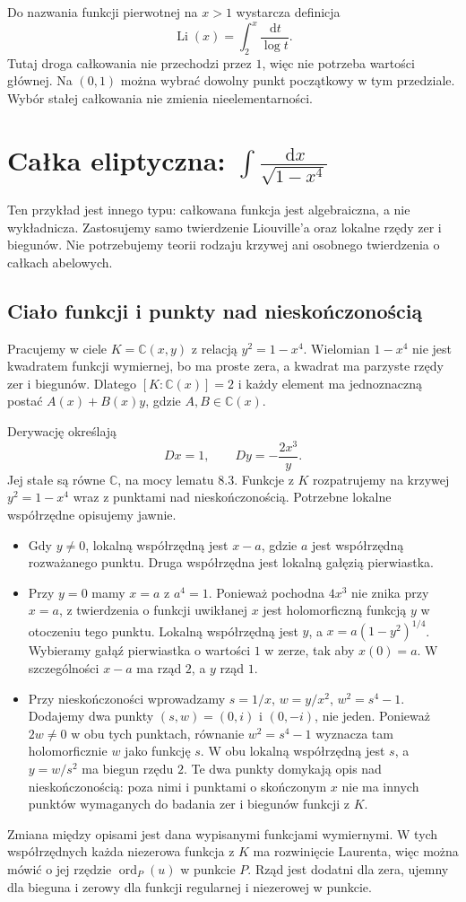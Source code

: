 \documentclass[11pt,a4paper,oneside]{book}
\numberwithin{equation}{section}
\theoremstyle{plain}
\theoremstyle{definition}
\theoremstyle{remark}
\newcommand{\C}{\mathbb{C}}
\newcommand{\ord}{\operatorname{ord}}
\newcommand{\dd}{\,\mathrm{d}}
\begin{document}
Do nazwania funkcji pierwotnej na $x>1$ wystarcza definicja
\[
\operatorname{Li}(x)=\int_2^x\frac{\dd t}{\log t}.
\]
Tutaj droga całkowania nie przechodzi przez $1$, więc nie potrzeba wartości głównej. Na $(0,1)$ można wybrać dowolny punkt początkowy w tym przedziale. Wybór stałej całkowania nie zmienia nieelementarności.

\section{Całka eliptyczna: $\int \frac{\dd x}{\sqrt{1-x^4}}$}

Ten przykład jest innego typu: całkowana funkcja jest algebraiczna, a nie wykładnicza. Zastosujemy samo twierdzenie Liouville'a oraz lokalne rzędy zer i biegunów. Nie potrzebujemy teorii rodzaju krzywej ani osobnego twierdzenia o całkach abelowych.

\subsection{Ciało funkcji i punkty nad nieskończonością}

Pracujemy w ciele $K=\C(x,y)$ z relacją $y^2=1-x^4$. Wielomian $1-x^4$ nie jest kwadratem funkcji wymiernej, bo ma proste zera, a kwadrat ma parzyste rzędy zer i biegunów. Dlatego $[K:\C(x)]=2$ i każdy element ma jednoznaczną postać $A(x)+B(x)y$, gdzie $A,B\in\C(x)$.

Derywację określają
\[
Dx=1,\qquad Dy=-\frac{2x^3}{y}.
\]
Jej stałe są równe $\C$, na mocy lematu 8.3. Funkcje z $K$ rozpatrujemy na krzywej $y^2=1-x^4$ wraz z punktami nad nieskończonością. Potrzebne lokalne współrzędne opisujemy jawnie.
\begin{itemize}
\item Gdy $y\ne0$, lokalną współrzędną jest $x-a$, gdzie $a$ jest współrzędną rozważanego punktu. Druga współrzędna jest lokalną gałęzią pierwiastka.
\item Przy $y=0$ mamy $x=a$ z $a^4=1$. Ponieważ pochodna $4x^3$ nie znika przy $x=a$, z twierdzenia o funkcji uwikłanej $x$ jest holomorficzną funkcją $y$ w otoczeniu tego punktu. Lokalną współrzędną jest $y$, a $x=a(1-y^2)^{1/4}$. Wybieramy gałąź pierwiastka o wartości $1$ w zerze, tak aby $x(0)=a$. W szczególności $x-a$ ma rząd $2$, a $y$ rząd $1$.
\item Przy nieskończoności wprowadzamy $s=1/x$, $w=y/x^2$, $w^2=s^4-1$. Dodajemy dwa punkty $(s,w)=(0,i)$ i $(0,-i)$, nie jeden. Ponieważ $2w\ne0$ w obu tych punktach, równanie $w^2=s^4-1$ wyznacza tam holomorficznie $w$ jako funkcję $s$. W obu lokalną współrzędną jest $s$, a $y=w/s^2$ ma biegun rzędu $2$. Te dwa punkty domykają opis nad nieskończonością: poza nimi i punktami o skończonym $x$ nie ma innych punktów wymaganych do badania zer i biegunów funkcji z $K$.
\end{itemize}
Zmiana między opisami jest dana wypisanymi funkcjami wymiernymi. W tych współrzędnych każda niezerowa funkcja z $K$ ma rozwinięcie Laurenta, więc można mówić o jej rzędzie $\ord_P(u)$ w punkcie $P$. Rząd jest dodatni dla zera, ujemny dla bieguna i zerowy dla funkcji regularnej i niezerowej w punkcie.
\end{document}
